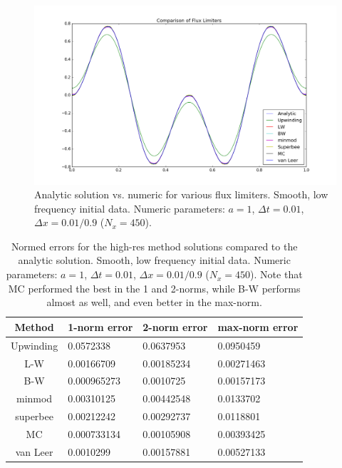 \documentclass[12pt]{article}
\begin{document}
\begin{figure}[H]
\centering\includegraphics[scale=0.45]{smooth_lowfreq_fluxcomp.png}
\caption{Analytic solution vs. numeric for various flux limiters. Smooth, low frequency initial data. Numeric parameters: $a=1$, $\Delta t = 0.01$, $\Delta x = 0.01/0.9$ ($N_x = 450$).}
\end{figure}

\begin{table}[H]
\centering\begin{tabular}{||c|l|l|l||}
\hline \hline
   Method &   1-norm error &   2-norm error &   max-norm error \\
\hline
        Upwinding &    0.0572338   &     0.0637953  &       0.0950459  \\
        L-W &    0.00166709  &     0.00185234 &       0.00271463 \\
        \color{blue}B-W &    \color{blue}0.000965273 & \color{blue}0.0010725  &       \color{red}0.00157173 \\
        minmod &    0.00310125  &     0.00442548 &       0.0133702  \\
        superbee &    0.00212242  &     0.00292737 &       0.0118801  \\
        \color{red}MC &    \color{red}0.000733134 &  \color{red}0.00105908 & \color{blue}0.00393425 \\
        van Leer &    0.0010299   &     0.00157881 &       0.00527133 \\
\hline \hline
\end{tabular}
\caption{Normed errors for the high-res method solutions compared to the analytic solution. Smooth, low frequency initial data. Numeric parameters: $a=1$, $\Delta t = 0.01$, $\Delta x = 0.01/0.9$ ($N_x = 450$). Note that MC performed the best in the 1 and 2-norms, while B-W performs almost as well, and even better in the max-norm.}
\end{table}
\end{document}
